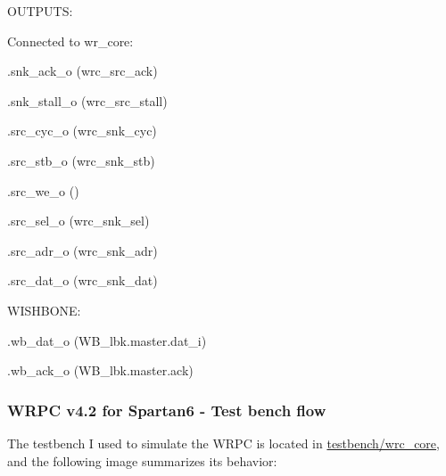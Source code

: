 \begin{dig}
\begin{dig}
\begin{dig}
        \end{dig}
    \item OUTPUTS:
        \begin{dig}
        \item Connected to wr\_core:
            \begin{dig}
            \item .snk\_ack\_o                  (wrc\_src\_ack)
            \item .snk\_stall\_o                (wrc\_src\_stall)
            \item 
            \item .src\_cyc\_o                  (wrc\_snk\_cyc)
            \item .src\_stb\_o                  (wrc\_snk\_stb)
            \item .src\_we\_o                   ()
            \item .src\_sel\_o                  (wrc\_snk\_sel)
            \item .src\_adr\_o                  (wrc\_snk\_adr)
            \item .src\_dat\_o                  (wrc\_snk\_dat)
            \end{dig}
        \item WISHBONE:
            \begin{dig}
            \item .wb\_dat\_o                   (WB\_lbk.master.dat\_i)
            \item .wb\_ack\_o                   (WB\_lbk.master.ack)
            \end{dig}
        \end{dig}
    \end{dig}
\end{dig}

\newpage 

\subsubsection{WRPC v4.2 for Spartan6 - Test bench flow}

\noindent The testbench I used to simulate the WRPC is located in \href{https://gitlab.com/ohwr/project/wr-cores/-/tree/master/testbench/wrc_core}{testbench/wrc\_core}, and the following image summarizes its behavior:

